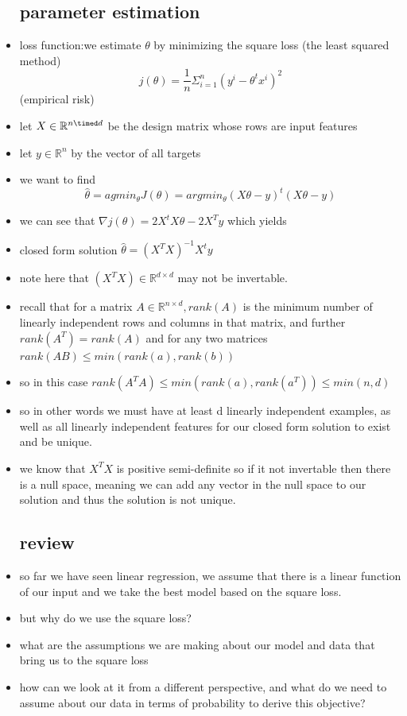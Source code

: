 \documentclass{article}
\begin{document}
\begin{itemize}
\subsection{parameter estimation}
\item loss function:we estimate  $\theta$ by minimizing the square loss (the least squared method)$$j(\theta)=\frac{1}{n}\Sigma_{i=1}^{n}(y^i-\theta^tx^i)^2$$ (empirical risk)
\item let $X\in \mathbb{R}^{n\timed d}$
 be the design matrix whose rows are input features 
 \item let $y\in \mathbb{R}^{n}$ by the vector of all targets 
 \item we want to find $$\hat{\theta}=agmin_{\theta}J(\theta)=argmin_{\theta}(X\theta-y)^t(X\theta-y)$$
 \item we can see that $\nabla j(\theta)= 2X^tX\theta-2X^Ty$ which yields
 \item closed form solution $\hat{\theta}=(X^TX)^{-1}X^ty$
 \item note here that $(X^TX)\in \mathbb{R}^{d\times d}$ may not be invertable. 
 \item recall that for a matrix $A\in \mathbb{R}^{n\times d}, rank(A)$ is the minimum number of linearly independent rows and columns in that matrix, and further $rank(A^T)=rank(A)$ and for any two matrices $rank(AB)\leq min(rank(a),rank(b))$
 \item so in this case $rank(A^TA)\leq min(rank(a),rank(a^T))\leq min(n,d)$
 \item so in other words we must have at least d linearly independent examples, as well as all linearly independent features for our closed form solution to exist and be unique.
 \item we know that $X^TX$ is positive semi-definite so if it not invertable then there is a null space, meaning we can add any vector in the null space to our solution and thus the solution is not unique. 
 \subsection{review}
 \item so far we have seen linear regression, we assume that there is a linear function of our input and we take the best model based on the square loss.
 \item but why do we use the square loss? 
 \item what are the assumptions we are making about our model and data that bring us to the square loss
 \item how can we look at it from a different perspective, and what do we need to assume about our data in terms of probability to derive this objective? 

\end{itemize}
\end{document}

